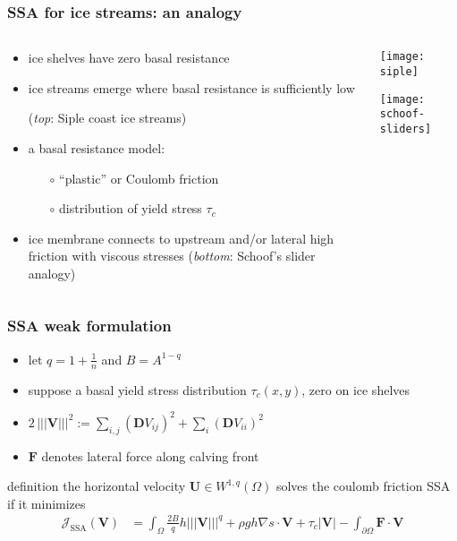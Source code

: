 \documentclass{beamer}
\newcommand{\grad}{\nabla}
\newcommand{\Tnorm}[1]{\left|\!\left|\!\left|#1\right|\!\right|\!\right|}
\begin{document}
\begin{frame}
  \frametitle{SSA for ice streams: an analogy}

\begin{columns}
\begin{column}{0.6\textwidth}
\begin{itemize}
\item ice shelves have zero basal resistance
\item ice streams emerge where basal resistance is sufficiently low

(\emph{top}: Siple coast ice streams)
\item a basal resistance model:
  \begin{itemize}
  \item[$\circ$] ``plastic'' or Coulomb friction 
  \item[$\circ$] distribution of yield stress $\tau_c$
  \end{itemize}
\item ice membrane connects to upstream and/or lateral high friction with viscous stresses (\emph{bottom}: Schoof's slider analogy)
\end{itemize}
\end{column}
\begin{column}{0.4\textwidth}
\texttt{[image: siple]}

\vspace{0.3in}

\texttt{[image: schoof-sliders]}
\end{column}
\end{columns}
\end{frame}


\begin{frame}
  \frametitle{SSA weak formulation}

\begin{itemize}
\item let $q = 1+\frac{1}{n}$ and $B = A^{1-q}$
\item suppose a basal yield stress distribution $\tau_c(x,y)$, zero on ice shelves
\item $2\,\Tnorm{\mathbf{V}}^2 := \sum_{i,j} (\mathbf{D}V_{ij})^2 + \sum_{i} (\mathbf{D}V_{ii})^2$
\item $\mathbf{F}$ denotes lateral force along calving front
\end{itemize}

\begin{block}{definition}
the horizontal velocity $\mathbf{U}\in W^{1,q}(\Omega)$ solves the coulomb friction SSA if it minimizes
\small
\begin{align*}
\mathcal{J}_{\text{SSA}}(\mathbf{V}) &= \int_\Omega \frac{2 B}{q} h \Tnorm{\mathbf{V}}^q + \rho g h \grad s \cdot \mathbf{V} + \tau_c |\mathbf{V}| - \int_{\partial\Omega} \mathbf{F} \cdot \mathbf{V}
\end{align*}
\end{block}

\end{frame}
\end{document}

